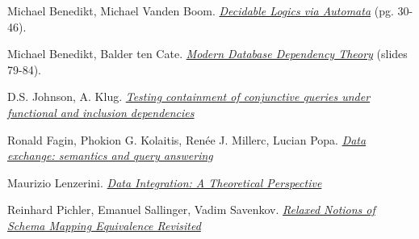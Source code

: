 \documentclass[11pt, a4paper, dvipsnames]{article}
\begin{document}
\begin{thebibliography}{9}

Michael Benedikt, Michael Vanden Boom. \emph{\href{http://www.cs.ox.ac.uk/michael.benedikt/readingcourse/coursenotes2020.pdf}{Decidable Logics via Automata}} (pg. 30-46).

Michael Benedikt, Balder ten Cate. \emph{\href{https://cpb-us-e1.wpmucdn.com/sites.ucsc.edu/dist/4/1230/files/2014/09/esslli-all.compressed.pdf} {Modern Database
Dependency Theory}} (slides 79-84).

D.S. Johnson, A. Klug. \emph{\href{https://cs.uwaterloo.ca/~david/kbdb/johnstonandklug.pdf}{Testing containment of conjunctive queries under functional and inclusion dependencies}}

Ronald Fagin, Phokion G. Kolaitis, Renée J. Millerc,
Lucian Popa. \emph{\href{http://dblab.cs.toronto.edu/project/dataexchange/docs/tcs05.pdf}{Data exchange: semantics and query answering}}

Maurizio Lenzerini. \emph{\href{https://tanca.faculty.polimi.it/wp-content/uploads/images/documents/TIS/lezioni/1_3_integration-lenzerini.pdf}{Data Integration: A Theoretical Perspective}}

Reinhard Pichler, Emanuel Sallinger, Vadim Savenkov. \emph{\href{http://www.dit.unitn.it/~p2p/RelatedWork/Matching/a10-pichler.pdf}{Relaxed Notions of Schema Mapping Equivalence Revisited}}

\end{thebibliography}
\end{document}
